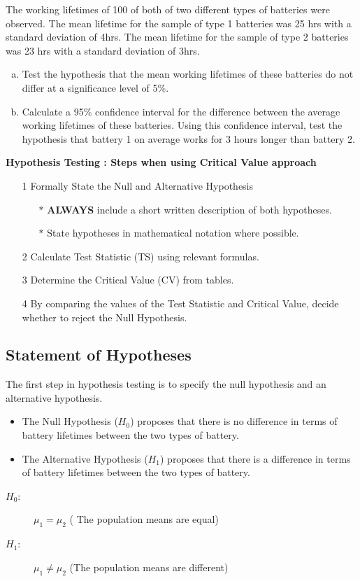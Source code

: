 \documentclass[a4paper,12pt]{article}
\begin{document}
\large 
\noindent
The working lifetimes of 100 of both of two different types of batteries were observed. 
The mean lifetime for the sample of type 1 batteries was 25 hrs with a standard deviation of 4hrs. 
The mean lifetime for the sample of type 2 batteries was 23 hrs with a standard deviation of 3hrs. 
\begin{enumerate}[(a)]
\item Test the hypothesis that the mean working lifetimes of these batteries do not differ at a significance level of 5\%.
\item 
Calculate a 95\% confidence interval for the difference between the average working lifetimes of these batteries. 
Using this confidence interval, test the hypothesis that battery 1 on average works for 3 hours longer than battery 2.
\end{enumerate}


\begin{framed}
\noindent \textbf{Hypothesis Testing : Steps when using Critical Value approach}

\begin{itemize}
\item[1] Formally State the Null and Alternative Hypothesis \smallskip
{
\begin{itemize}
\item[$\ast$] \textbf{ALWAYS} include a short written description of both hypotheses.
\item[$\ast$] State hypotheses in mathematical notation where possible.

\end{itemize}
}
\item[2] Calculate Test Statistic (TS) using relevant formulas.\smallskip
\item[3] Determine the Critical Value (CV) from tables. \smallskip
\item[4] By comparing the values of the Test Statistic and Critical Value, decide whether to reject the Null Hypothesis.
\end{itemize}
\end{framed}

\subsection*{Statement of Hypotheses}
\noindent The first step in hypothesis testing is to specify the null hypothesis and an alternative hypothesis.
\begin{itemize}
    \item The Null Hypothesis ($H_0$) proposes that there is no difference in terms of battery lifetimes between the two types of battery.
    \item The Alternative Hypothesis ($H_1$) proposes that there is a difference in terms of battery lifetimes between the two types of battery.
\end{itemize}
\begin{description}
\item[$H_0$:] $\mu_1 = \mu_2$ ( The population means are equal)
\item[$H_1$:] $\mu_1 \neq \mu_2$ (The population means are different)
\end{description}
\end{document}
